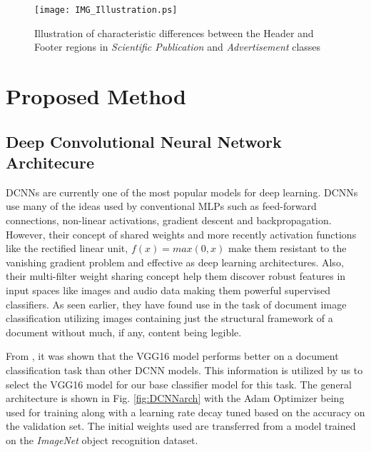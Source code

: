 \documentclass[10pt,conference,a4paper]{IEEEtran}
\begin{document}
\begin{figure}[]
	\centering
	\texttt{[image: IMG\_Illustration.ps]}
	\caption{Illustration of characteristic differences between the Header and Footer regions in \textit{Scientific Publication} and \textit{Advertisement} classes} \label{fig:classDif}
\end{figure}


\section{Proposed Method}


\subsection{Deep Convolutional Neural Network Architecure}
DCNNs are currently one of the most popular models for deep learning. DCNNs use many of the ideas used by conventional MLPs such as feed-forward connections, non-linear activations, gradient descent and backpropagation. However, their concept of shared weights and more recently activation functions like the rectified linear unit, $f(x)=max(0,x)$ make them resistant to the vanishing gradient problem and effective as deep learning architectures. Also, their multi-filter weight sharing concept help them discover robust features in input spaces like images and audio data making them powerful supervised classifiers.\cite{Krizhevsky2012,sainath2013deep} As seen earlier, they have found use in the task of document image classification utilizing images containing just the structural framework of a document without much, if any, content being legible.


From \cite{tensmeyer2017analysis, csurka2016right, afzal2017cutting}, it was shown that the VGG16 model \cite{simonyan2014very} performs better on a document classification task than other DCNN models. This information is utilized by us to select the VGG16 model for our base classifier model for this task. The general architecture is shown in Fig. \ref{fig:DCNNarch} with the Adam Optimizer \cite{kingma2014adam} being used for training along with a learning rate decay tuned based on the accuracy on the validation set. The initial weights used are transferred from a model trained on the \textit{ImageNet} object recognition dataset.
\end{document}
